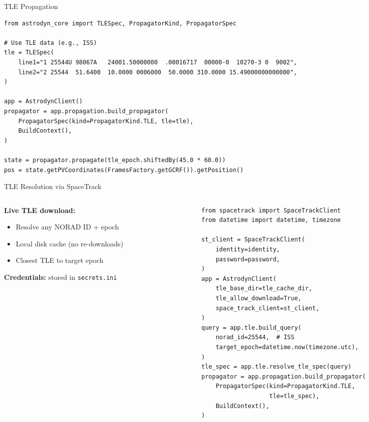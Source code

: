 \documentclass[aspectratio=169,12pt]{beamer}
\begin{document}
\begin{frame}[fragile]{TLE Propagation}
    \begin{verbatim}
from astrodyn_core import TLESpec, PropagatorKind, PropagatorSpec

# Use TLE data (e.g., ISS)
tle = TLESpec(
    line1="1 25544U 98067A   24001.50000000  .00016717  00000-0  10270-3 0  9002",
    line2="2 25544  51.6400  10.0000 0006000  50.0000 310.0000 15.49000000000000",
)

app = AstrodynClient()
propagator = app.propagation.build_propagator(
    PropagatorSpec(kind=PropagatorKind.TLE, tle=tle),
    BuildContext(),
)

state = propagator.propagate(tle_epoch.shiftedBy(45.0 * 60.0))
pos = state.getPVCoordinates(FramesFactory.getGCRF()).getPosition()
    \end{verbatim}
\end{frame}

\begin{frame}[fragile]{TLE Resolution via SpaceTrack}
    \begin{columns}
        \begin{column}{0.45\textwidth}
            \textbf{Live TLE download:}
            \begin{itemize}
                \item Resolve any NORAD ID + epoch
                \item Local disk cache (no re-downloads)
                \item Closest TLE to target epoch
            \end{itemize}
            \vspace{0.3cm}
            \textbf{Credentials:} stored in \texttt{secrets.ini}
        \end{column}
        \begin{column}{0.55\textwidth}
            \begin{verbatim}
from spacetrack import SpaceTrackClient
from datetime import datetime, timezone

st_client = SpaceTrackClient(
    identity=identity,
    password=password,
)
app = AstrodynClient(
    tle_base_dir=tle_cache_dir,
    tle_allow_download=True,
    space_track_client=st_client,
)
query = app.tle.build_query(
    norad_id=25544,  # ISS
    target_epoch=datetime.now(timezone.utc),
)
tle_spec = app.tle.resolve_tle_spec(query)
propagator = app.propagation.build_propagator(
    PropagatorSpec(kind=PropagatorKind.TLE,
                   tle=tle_spec),
    BuildContext(),
)
            \end{verbatim}
        \end{column}
    \end{columns}
\end{frame}
\end{document}
